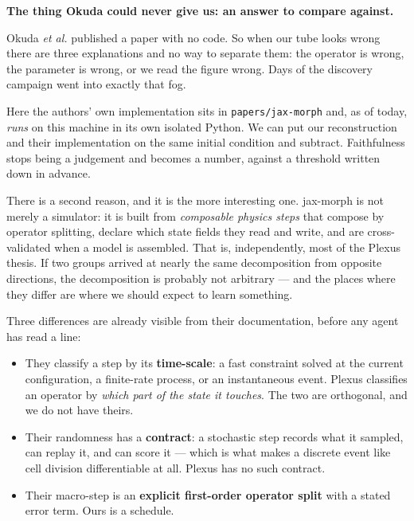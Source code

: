 \documentclass[11pt,a4paper]{article}
\newcommand{\code}[1]{\texttt{#1}}
\begin{document}
\begin{tcolorbox}[colback=rule!4,colframe=rule!55,boxrule=0.7pt,arc=2pt]
\textbf{The thing Okuda could never give us: an answer to compare against.}

Okuda \emph{et al.} published a paper with no code. So when our tube looks wrong there are three
explanations and no way to separate them: the operator is wrong, the parameter is wrong, or we
read the figure wrong. Days of the discovery campaign went into exactly that fog.

Here the authors' own implementation sits in \code{papers/jax-morph} and, as of today, \emph{runs}
on this machine in its own isolated Python. We can put our reconstruction and their implementation
on the same initial condition and subtract. Faithfulness stops being a judgement and becomes a
number, against a threshold written down in advance.
\end{tcolorbox}

There is a second reason, and it is the more interesting one. jax-morph is not merely a simulator:
it is built from \emph{composable physics steps} that compose by operator splitting, declare which
state fields they read and write, and are cross-validated when a model is assembled. That is,
independently, most of the Plexus thesis. If two groups arrived at nearly the same decomposition
from opposite directions, the decomposition is probably not arbitrary --- and the places where
they differ are where we should expect to learn something.

Three differences are already visible from their documentation, before any agent has read a line:

\begin{itemize}
\item They classify a step by its \textbf{time-scale}: a fast constraint solved at the current
configuration, a finite-rate process, or an instantaneous event. Plexus classifies an operator by
\emph{which part of the state it touches}. The two are orthogonal, and we do not have theirs.
\item Their randomness has a \textbf{contract}: a stochastic step records what it sampled, can
replay it, and can score it --- which is what makes a discrete event like cell division
differentiable at all. Plexus has no such contract.
\item Their macro-step is an \textbf{explicit first-order operator split} with a stated error
term. Ours is a schedule.
\end{itemize}
\end{document}
